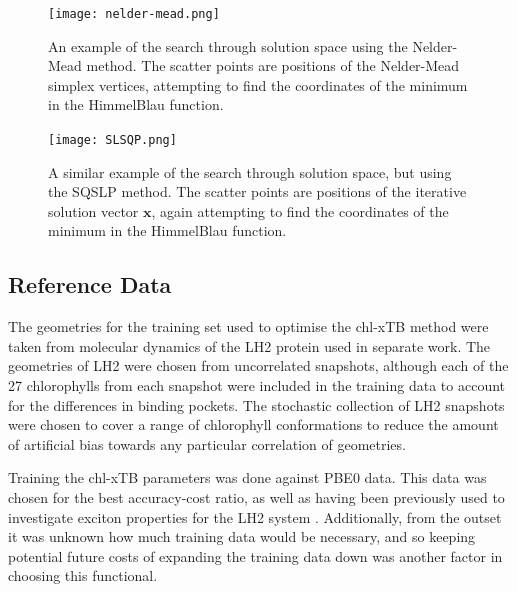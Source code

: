 \begin{figure}
    \texttt{[image: nelder-mead.png]}
    \label{fig:nelder_mead}
    \caption{An example of the search through solution space using the Nelder-Mead
    method. The scatter points are positions of the Nelder-Mead simplex vertices,
    attempting to find the coordinates of the minimum in the HimmelBlau function.}
\end{figure}

\begin{figure}
    \texttt{[image: SLSQP.png]}
    \label{fig:slsqp}
    \caption{A similar example of the search through solution space, but using the
    SQSLP method. The scatter points are positions of the iterative solution vector
    $\mathbf{x}$, again attempting to find the coordinates of the minimum in the 
    HimmelBlau function.}
\end{figure}

\subsection{Reference Data}
\label{subsec:ref_data}
The geometries for the training set used to optimise the chl-xTB method were taken
from molecular dynamics of the LH2 protein used in separate work\cite{Stross2016}. 
The geometries of LH2 were chosen from uncorrelated snapshots, although each of
the 27 chlorophylls from each snapshot were included in the training data to account
for the differences in binding pockets. The stochastic collection of LH2 snapshots
were chosen to cover a range of chlorophyll conformations to reduce the amount of
artificial bias towards any particular correlation of geometries.

Training the chl-xTB parameters was done against PBE0 data. This data was chosen
for the best accuracy-cost ratio, as well as having been previously used to investigate
exciton properties for the LH2 system \cite{Stross2016}. Additionally, from the
outset it was unknown how much training data would be necessary, and so keeping 
potential future costs of expanding the training data down was another factor in 
choosing this functional.


